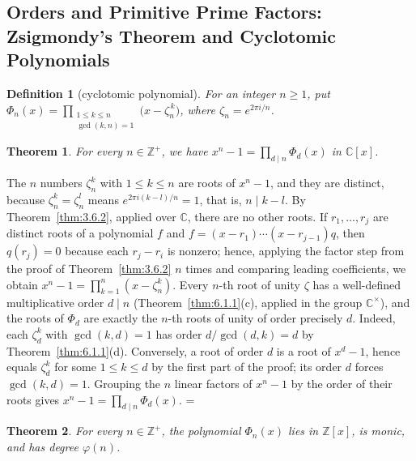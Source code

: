 \documentclass[11pt]{article}
\makeatletter
\let\nt@closedisplay\]
\def\nt@guardedclose{\@ifnextchar\par{\nt@closeafterpar}{\@ifnextchar\end{\postdisplaypenalty\@M\nt@closedisplay}{\nt@closedisplay}}}
\def\nt@closeafterpar\par{\@ifnextchar\par{\nt@closeafterpar}{\@ifnextchar\end{\postdisplaypenalty\@M\nt@closedisplay\par}{\nt@closedisplay\par}}}
\renewenvironment{proof}[1][\proofname]{\par
  \pushQED{\qed}\normalfont\topsep\medskipamount\edef\nt@afterproof{\@endparpenalty=\the\@endparpenalty\relax}\@beginparpenalty\@M\@endparpenalty\@M\let\]\nt@guardedclose\trivlist\item[]\textit{#1\@addpunct{.}} \ignorespaces}{\ifvmode\addpenalty\@M\fi\popQED\nt@afterproof\endtrivlist\@endpefalse}
\theoremstyle{ntstyle}
\newtheorem{theorem}{Theorem}[subsection]
\newtheorem{definition}{Definition}[subsection]
\makeatother
\begin{document}
\subsection{Orders and Primitive Prime Factors: Zsigmondy's Theorem and Cyclotomic Polynomials}

\begin{definition}[cyclotomic polynomial]\label{def:6.11.1}\label{def:cyclotomic-polynomial}
  For an integer $n\ge1$, put
  $\Phi_n(x) = \prod_{\substack{1 \le k \le n \\ \gcd(k, n) = 1}}\big(x - \zeta_n^{\,k}\big)$, where
  $\zeta_n = e^{2\pi i / n}$.

\end{definition}

\begin{theorem}\label{thm:6.11.1}
  For every $n\in\mathbb{Z}^+$, we have $x^{n} - 1 = \prod_{d \mid n} \Phi_d(x)$ in $\mathbb{C}[x]$.

\end{theorem}

\begin{proof} The $n$ numbers $\zeta_n^k$ with $1\le k\le n$ are roots of
  $x^n-1$, and they are distinct, because $\zeta_n^k=\zeta_n^l$ means
  $e^{2\pi i(k-l)/n}=1$, that is, $n\mid k-l$. By Theorem~\ref{thm:3.6.2},
  applied over $\mathbb{C}$, there are no other roots. If $r_1,\ldots,r_j$
  are distinct roots of a polynomial $f$ and $f=(x-r_1)\cdots(x-r_{j-1})q$,
  then $q(r_j)=0$ because each $r_j-r_i$ is nonzero; hence, applying the factor step from the proof of
  Theorem~\ref{thm:3.6.2} $n$ times and comparing leading coefficients, we obtain
  $x^n-1=\prod_{k=1}^{n}(x-\zeta_n^k)$. Every $n$-th root of unity
  $\zeta$ has a well-defined multiplicative order $d \mid n$
  (Theorem~\ref{thm:6.1.1}(c), applied in the group $\mathbb{C}^{\times}$),
  and the roots of $\Phi_d$ are exactly the $n$-th roots of unity of order precisely $d$. Indeed, each $\zeta_d^k$
  with $\gcd(k,d)=1$ has order $d/\gcd(d,k)=d$ by Theorem~\ref{thm:6.1.1}(d). Conversely, a root of order $d$ is a
  root of $x^d-1$, hence equals $\zeta_d^k$ for some $1\le k\le d$ by the first part of the proof; its order $d$
  forces $\gcd(k,d)=1$. Grouping the $n$ linear factors of $x^{n} - 1$
  by the order of their roots gives $x^{n} - 1 = \prod_{d \mid n} \Phi_d(x)$.
\end{proof}

\begin{theorem}\label{thm:6.11.2} For every $n\in\mathbb{Z}^+$, the polynomial $\Phi_n(x)$ lies in $\mathbb{Z}[x]$, is
  monic, and has degree $\varphi(n)$.

\end{theorem}
\end{document}
